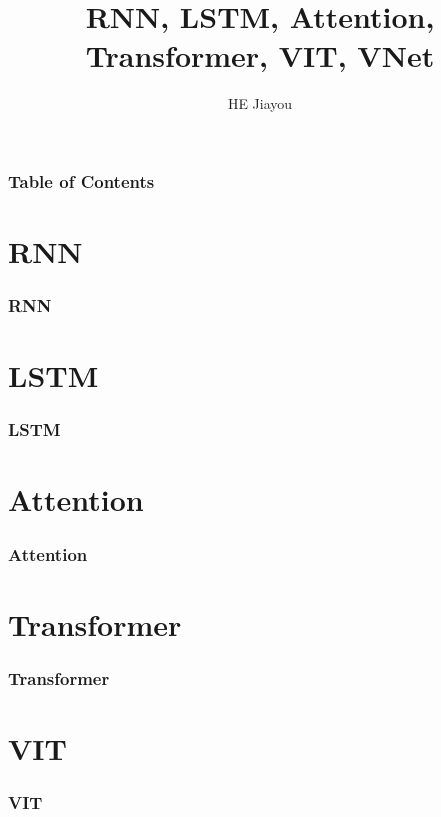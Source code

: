 \documentclass[]{beamer}
\title[]{RNN, LSTM, Attention, Transformer, VIT, VNet}
\author{HE Jiayou}
\begin{document}
\frame{\titlepage}

\begin{frame}
    \frametitle{Table of Contents}
    \tableofcontents
\end{frame}

\section{RNN}
\begin{frame}
    \frametitle{RNN}
    
\end{frame}

\section{LSTM}
\begin{frame}
    \frametitle{LSTM}
\end{frame}

\section{Attention}
\begin{frame}
    \frametitle{Attention}
\end{frame}

\section{Transformer}
\begin{frame}
    \frametitle{Transformer}
\end{frame}

\section{VIT}
\begin{frame}
    \frametitle{VIT}
\end{frame}
\end{document}
